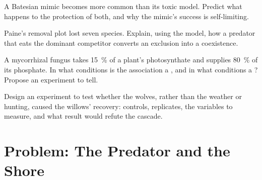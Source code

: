 \begin{exercise}[$\star\star$]\label{exo:b1:species-interactions:9}
A Batesian mimic becomes more common than its toxic model. Predict
what happens to the protection of both, and why the mimic's success
is self-limiting.
\end{exercise}

\begin{exercise}[$\star\star\star$]\label{exo:b1:species-interactions:10}
Paine's removal plot lost seven species. Explain, using the 
model, how a predator that eats the dominant competitor converts an
exclusion into a coexistence.
\end{exercise}

\begin{exercise}[$\star\star\star$]\label{exo:b1:species-interactions:11}
A mycorrhizal fungus takes \qty{15}{\%} of a plant's photosynthate and
supplies \qty{80}{\%} of its phosphate. In what conditions is the
association a , and in what conditions a ? Propose
an experiment to tell.
\end{exercise}

\begin{exercise}[$\star\star\star$]\label{exo:b1:species-interactions:12}
Design an experiment to test whether the wolves, rather than the
weather or hunting, caused the willows' recovery: controls, replicates,
the variables to measure, and what result would refute the cascade.
\end{exercise}

\section{Problem: The Predator and the Shore}

